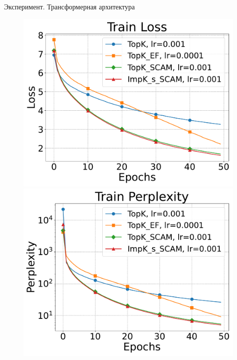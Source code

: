 \documentclass{beamer}
\begin{document}

\begin{frame}{Эксперимент. Трансформерная архитектура}

    \begin{figure}[ht]
        \centering
        \begin{minipage}{0.4\textwidth}
            \includegraphics[width=\textwidth]{../paper/figures/gpt2/experiment2/Train Loss.pdf}
        \end{minipage}
        \begin{minipage}{0.4\textwidth}
            \includegraphics[width=\textwidth]{../paper/figures/gpt2/experiment2/Train Perplexity.pdf}

\end{minipage}
\end{figure}
\end{frame}
\end{document}
